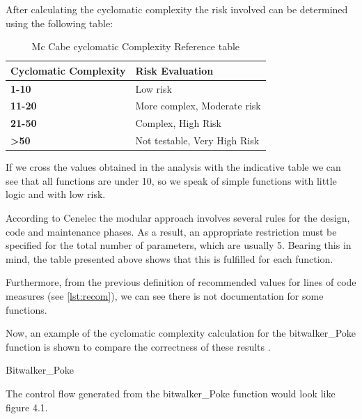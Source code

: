 After calculating the cyclomatic complexity the risk involved can be determined using the following table:

{\footnotesize\sffamily\centering
  \begin{longtable}{||p{}|p{}||}
  \caption{Mc Cabe cyclomatic Complexity Reference table}\\
    \hline\hline
    \textbf{Cyclomatic Complexity} & \textbf{Risk Evaluation} \\
    \hline\hline
    \endhead
    \hline\hline
    \endfoot
    \textbf{1-10}
& Low risk
    \\
    \hline
    \textbf{11-20}
& More complex, Moderate risk
    \\
    \hline
    \textbf{21-50}
& Complex, High Risk
    \\
    \hline
    \textbf{>50}
& Not testable, Very High Risk
    \\
    \hline
\end{longtable}}

If we cross the values ​​obtained in the analysis with the indicative table we can see that all functions are under 10, so we speak of simple functions with little logic and with low risk.

According to Cenelec the modular approach involves several rules for the design, code and maintenance phases. As a result, an appropriate restriction must be specified for the total number of parameters, which are usually 5. Bearing this in mind, the table presented above shows that this is fulfilled for each function.

Furthermore, from the previous definition of recommended values for lines of code measures (see \ref{lst:recom}), we can see there is not documentation for some functions.

Now, an example of the cyclomatic complexity calculation for the bitwalker\_Poke function is shown to compare the correctness of these results .

\begin{listing}[hbt]
\begin{minipage}{\textwidth}

\end{minipage}
\caption{Bitwalker\_Poke}
\end{listing}

The control flow generated from the bitwalker\_Poke function would look like figure 4.1.

